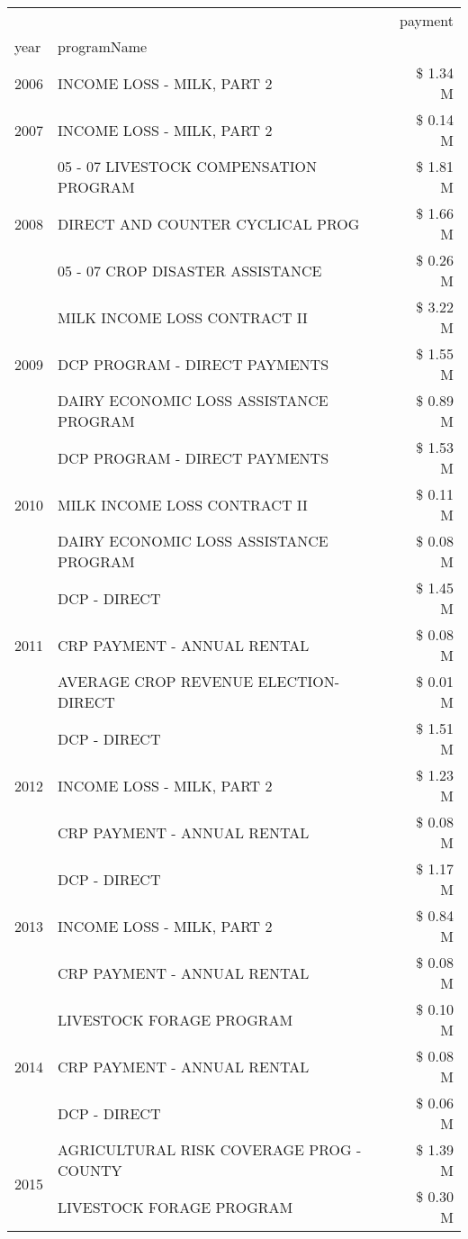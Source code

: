 \begin{tabular}{llr}
\toprule
 &  & payment \\
year & programName &  \\
\midrule
2006 & INCOME LOSS - MILK, PART 2 & \$ 1.34 M \\
\cline{1-3}
2007 & INCOME LOSS - MILK, PART 2 & \$ 0.14 M \\
\cline{1-3}
\multirow[t]{3}{*}{2008} & 05 - 07 LIVESTOCK COMPENSATION PROGRAM & \$ 1.81 M \\
 & DIRECT AND COUNTER CYCLICAL PROG & \$ 1.66 M \\
 & 05 - 07 CROP DISASTER ASSISTANCE & \$ 0.26 M \\
\cline{1-3}
\multirow[t]{3}{*}{2009} & MILK INCOME LOSS CONTRACT II & \$ 3.22 M \\
 & DCP PROGRAM - DIRECT PAYMENTS & \$ 1.55 M \\
 & DAIRY ECONOMIC LOSS ASSISTANCE PROGRAM & \$ 0.89 M \\
\cline{1-3}
\multirow[t]{3}{*}{2010} & DCP PROGRAM - DIRECT PAYMENTS & \$ 1.53 M \\
 & MILK INCOME LOSS CONTRACT II & \$ 0.11 M \\
 & DAIRY ECONOMIC LOSS ASSISTANCE PROGRAM & \$ 0.08 M \\
\cline{1-3}
\multirow[t]{3}{*}{2011} & DCP - DIRECT & \$ 1.45 M \\
 & CRP PAYMENT - ANNUAL RENTAL & \$ 0.08 M \\
 & AVERAGE CROP REVENUE ELECTION-DIRECT & \$ 0.01 M \\
\cline{1-3}
\multirow[t]{3}{*}{2012} & DCP - DIRECT & \$ 1.51 M \\
 & INCOME LOSS - MILK, PART 2 & \$ 1.23 M \\
 & CRP PAYMENT - ANNUAL RENTAL & \$ 0.08 M \\
\cline{1-3}
\multirow[t]{3}{*}{2013} & DCP - DIRECT & \$ 1.17 M \\
 & INCOME LOSS - MILK, PART 2 & \$ 0.84 M \\
 & CRP PAYMENT - ANNUAL RENTAL & \$ 0.08 M \\
\cline{1-3}
\multirow[t]{3}{*}{2014} & LIVESTOCK FORAGE PROGRAM & \$ 0.10 M \\
 & CRP PAYMENT - ANNUAL RENTAL & \$ 0.08 M \\
 & DCP - DIRECT & \$ 0.06 M \\
\cline{1-3}
\multirow[t]{3}{*}{2015} & AGRICULTURAL RISK COVERAGE PROG - COUNTY & \$ 1.39 M \\
 & LIVESTOCK FORAGE PROGRAM & \$ 0.30 M \\

\end{tabular}
